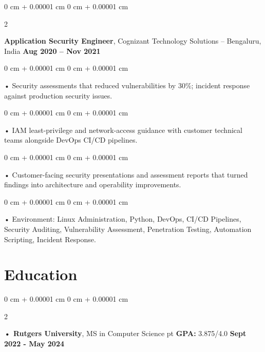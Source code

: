 \documentclass[10pt, letterpaper]{article}
\newenvironment{onecolentry}{
    \begin{adjustwidth}{
        0 cm + 0.00001 cm
    }{
        0 cm + 0.00001 cm
    }
}{
    \end{adjustwidth}
} %
\newenvironment{twocolentry}[2][]{
    \onecolentry
    \def\secondColumn{#2}
    \setcolumnwidth{\fill, 4.5 cm}
    \begin{paracol}{2}
}{
    \switchcolumn \raggedleft \secondColumn
    \end{paracol}
    \endonecolentry
} %
\begin{document}
        \begin{twocolentry}{
            \textbf{Aug 2020 -- Nov 2021}
        }
            \vspace{2 pt }
            \textbf{Application Security Engineer}, Cognizant Technology Solutions -- Bengaluru, India\end{twocolentry}
        \begin{onecolentry}
             • Security assessments that reduced vulnerabilities by 30\%; incident response against production security issues.
        \end{onecolentry}
        \begin{onecolentry}
             • IAM least-privilege and network-access guidance with customer technical teams alongside DevOps CI/CD pipelines.
        \end{onecolentry}
        \begin{onecolentry}
             • Customer-facing security presentations and assessment reports that turned findings into architecture and operability improvements.
        \end{onecolentry}
        \begin{onecolentry}
             • Environment: Linux Administration, Python, DevOps, CI/CD Pipelines, Security Auditing, Vulnerability Assessment, Penetration Testing, Automation Scripting, Incident Response.
        \end{onecolentry}
    \vspace{2 pt }
        \section{Education}
        \vspace{2 pt }
        \begin{twocolentry}{
            \textbf{Sept 2022 - May 2024}
        }
            \textbf{ • Rutgers University}, MS in Computer Science  pt \textbf{GPA:} 3.875/4.0  \end{twocolentry}
\end{document}

